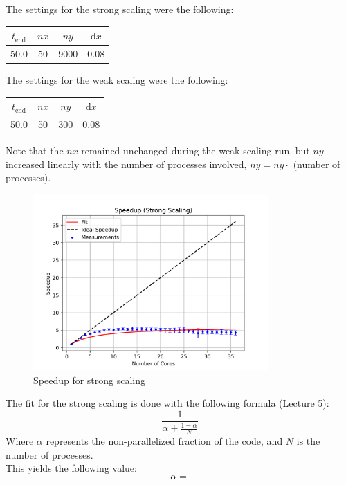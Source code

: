 \documentclass[12pt, a4paper, titlepage]{article}
\newcommand{\der}{\text{d}}
\begin{document}
{The settings for the strong scaling were the following:\\
\begin{center}
\begin{tabular}{c|c|c|c}
 $t_{\text{end}}$ & $nx$ & $ny$ & $\der x$ \\ \hline
 50.0 & 50 & 9000 & 0.08 \\
\end{tabular}
\end{center}

The settings for the weak scaling were the following:\\
\begin{center}
\begin{tabular}{c|c|c|c}
 $t_{\text{end}}$ & $nx$ & $ny$ & $\der x$ \\ \hline
 50.0 & 50 & 300 & 0.08 \\
\end{tabular}
\end{center}

Note that the $nx$ remained unchanged during the weak scaling run, but $ny$ increased linearly with the number of processes involved, $ny = ny \cdot $ (number of processes).


\begin{figure}[h!]
\begin{center}
\includegraphics[width=0.8\textwidth]{pictures/speedup_strong.png}
\caption{Speedup for strong scaling}
\end{center}
\end{figure}


The fit for the strong scaling is done with the following formula (Lecture 5):
\begin{equation}
\frac{1}{\alpha + \frac{1-\alpha}{N}}
\end{equation}
Where $\alpha$ represents the non-parallelized fraction of the code, and $N$ is the number of processes.\\
This yields the following value:
\begin{equation} 
\alpha=
\end{equation}

}
\end{document}

